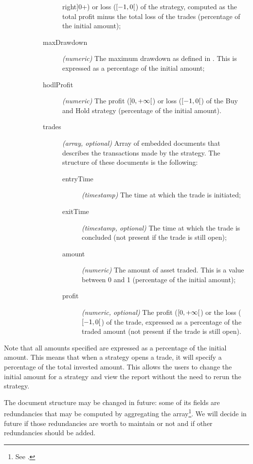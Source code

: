 \begin{description}
\begin{description}
\begin{description}
						right]{0}{+\infty}\)) or loss
						(\(\interval[open
						right]{-1}{0}\)) of the
						strategy, computed as the total
						profit minus the total loss of
						the trades (percentage of the
						initial amount);
					\item[maxDrawdown] \textit{(numeric)}
						The maximum drawdown as defined
						in . This is
						expressed as a percentage of the
						initial amount;
					\item[hodlProfit] \textit{(numeric)} The
						profit (\(\interval[open
						right]{0}{+\infty}\)) or loss
						(\(\interval[open
						right]{-1}{0}\)) of the Buy and
						Hold strategy (percentage of the
						initial amount).
					\item[trades] \textit{(array, optional)}
						Array of embedded documents that
						describes the transactions made
						by the strategy. The structure
						of these documents is the
						following:
						\begin{description}
							\item[entryTime]
								\textit{(timestamp)}
								The time at
								which the trade
								is initiated;
							\item[exitTime]
								\textit{(timestamp,
								optional)}
								The time at
								which the trade
								is concluded
								(not present if
								the trade is
								still open);
							\item[amount]
								\textit{(numeric)}
								The amount of
								asset traded.
								This is a value
								between 0 and 1
								(percentage of
								the initial
								amount);
							\item[profit]
								\textit{(numeric,
								optional)} The
								profit
								(\(\interval[open
								right]{0}{+\infty}\))
								or the loss
								(\(\interval[open
								right]{-1}{0}\))
								of the trade,
								expressed as a
								percentage of
								the traded
								amount (not
								present if the
								trade is still
								open).
						\end{description}
				\end{description}
		\end{description}
\end{description}

Note that all amounts specified are expressed as a percentage of the initial
amount. This means that when a strategy opens a trade, it will specify a
percentage of the total invested amount. This allows the users to change the
initial amount for a strategy and view the report without the need to rerun the
strategy.

The  document structure may be changed in future: some of its
fields are redundancies that may be computed by aggregating the 
array\footnote{See .}. We will decide in future if
those redundancies are worth to maintain or not and if other redundancies should
be added.
